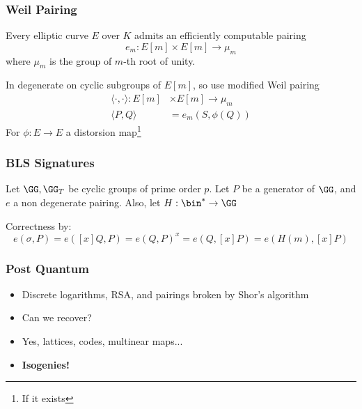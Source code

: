 \documentclass{beamer}
\begin{document}
\begin{frame}
    \frametitle{Weil Pairing}
    Every elliptic curve $E$ over $K$ admits an efficiently computable pairing
    \[ e_m : E[m] \times E[m] \to \mu_m \]
    where $\mu_m$ is the group of $m$-th root of unity. 

    In degenerate on cyclic subgroups of $E[m]$, so use modified Weil pairing
    \begin{align*}
        \langle \cdot , \cdot \rangle : E[m] &\times E[m] \to \mu_m \\
        \langle P, Q \rangle &= e_m(S, \phi(Q))
    \end{align*}
    For $\phi: E \to E$ a distorsion map\footnote{If it exists}

\end{frame}

\begin{frame}
    \frametitle{BLS Signatures}
    Let $\GG, \GG_T$ be cyclic groups of prime order $p$. Let $P$ be a generator of $\GG$, and $e$ a non degenerate pairing.
    Also, let $H: \bin^* \to \GG$
    \begin{center}
        
    \begin{pcvstack}
        \begin{pchstack}

        \end{pchstack}


    \end{pcvstack}
    \end{center}
    Correctness by:
    \[ e(\sigma, P) = e([x]Q, P) = e(Q, P)^x = e(Q, [x]P) = e(H(m), [x]P) \]
 
\end{frame}

\begin{frame}
    \frametitle{Post Quantum}
    \begin{itemize}
        \item<1-> Discrete logarithms, RSA, and pairings broken by Shor's algorithm
        \item<2-> Can we recover?
        \item<3-> Yes, lattices, codes, multinear maps...
        \item<4-> \textbf{Isogenies!}
    \end{itemize}
\end{frame}
\end{document}
